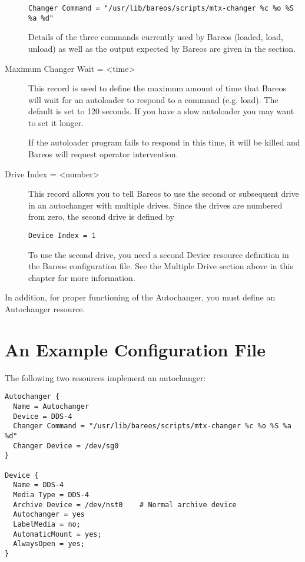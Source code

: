 \begin{description}
\footnotesize
\begin{verbatim}
Changer Command = "/usr/lib/bareos/scripts/mtx-changer %c %o %S %a %d"
\end{verbatim}
\normalsize

Details of the three
commands currently used by Bareos  (loaded, load, unload) as well as the
output expected by  Bareos are given in the  section.

\item [Maximum Changer Wait = {\textless}time{\textgreater}]
   This record is used to define the maximum amount of time that Bareos
   will wait for an autoloader to respond to a command (e.g.  load).  The
   default is set to 120 seconds.  If you have a slow autoloader you may
   want to set it longer.

If the autoloader program fails to respond in this time, it  will be killed
and Bareos will request operator intervention.

\item [Drive Index = {\textless}number{\textgreater}]
   This record allows you to tell Bareos to use the second or subsequent
   drive in an autochanger with multiple drives.  Since the drives are
   numbered from zero, the second drive is defined by

\footnotesize
\begin{verbatim}
Device Index = 1

\end{verbatim}
\normalsize

To use the second drive, you need a second Device resource definition  in the
Bareos configuration file. See the Multiple Drive section above  in this
chapter for more information.
\end{description}

In addition, for proper functioning of the Autochanger, you must
define an Autochanger resource.

\label{example}
\section{An Example Configuration File}

The following two resources implement an autochanger:

\footnotesize
\begin{verbatim}
Autochanger {
  Name = Autochanger
  Device = DDS-4
  Changer Command = "/usr/lib/bareos/scripts/mtx-changer %c %o %S %a %d"
  Changer Device = /dev/sg0
}

Device {
  Name = DDS-4
  Media Type = DDS-4
  Archive Device = /dev/nst0    # Normal archive device
  Autochanger = yes
  LabelMedia = no;
  AutomaticMount = yes;
  AlwaysOpen = yes;
}
\end{verbatim}
\normalsize


